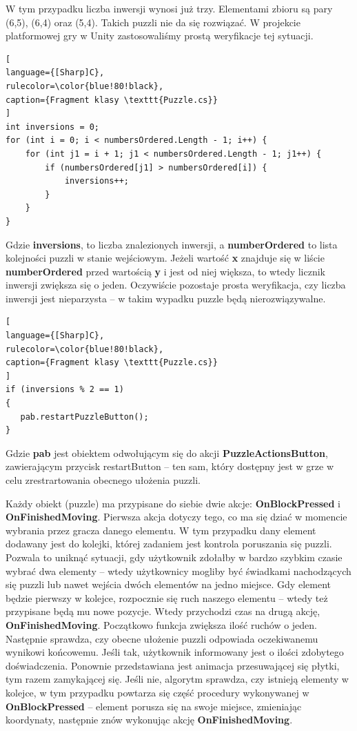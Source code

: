 \documentclass[oneside,polski,logo]{amuthesis}
\begin{document}
W tym przypadku liczba inwersji wynosi już trzy. Elementami zbioru są pary (6,5), (6,4) oraz (5,4). Takich puzzli nie da się rozwiązać. 
W projekcie platformowej gry w Unity zastosowaliśmy prostą weryfikacje tej sytuacji. 
\\
\begin{lstlisting}[
language={[Sharp]C},
rulecolor=\color{blue!80!black},
caption={Fragment klasy \texttt{Puzzle.cs}}
]
int inversions = 0;
for (int i = 0; i < numbersOrdered.Length - 1; i++) {
    for (int j1 = i + 1; j1 < numbersOrdered.Length - 1; j1++) {
        if (numbersOrdered[j1] > numbersOrdered[i]) {
            inversions++;
        }
    }
}

\end{lstlisting}
\par Gdzie \textbf{inversions}, to liczba znalezionych inwersji, a \textbf{numberOrdered} to lista kolejności puzzli w stanie wejściowym. Jeżeli wartość \textbf{x} znajduje się w liście \textbf{numberOrdered} przed wartością \textbf{y} i jest od niej większa, to wtedy licznik inwersji zwiększa się o jeden.
Oczywiście pozostaje prosta weryfikacja, czy liczba inwersji jest nieparzysta – w takim wypadku puzzle będą nierozwiązywalne.
\begin{lstlisting}[
language={[Sharp]C},
rulecolor=\color{blue!80!black},
caption={Fragment klasy \texttt{Puzzle.cs}}
]
if (inversions % 2 == 1)
{
   pab.restartPuzzleButton();
}
\end{lstlisting}

Gdzie \textbf{pab} jest obiektem odwołującym się do akcji \textbf{PuzzleActionsButton}, zawierającym przycisk restartButton – ten sam, który dostępny jest w grze w celu zrestrartowania obecnego ułożenia puzzli.

Każdy obiekt (puzzle) ma przypisane do siebie dwie akcje: \textbf{OnBlockPressed} i \textbf{OnFinishedMoving}. Pierwsza akcja dotyczy tego, co ma się dziać w momencie wybrania przez gracza danego elementu. W tym przypadku dany element dodawany jest do kolejki, której zadaniem jest kontrola poruszania się puzzli. Pozwala to uniknąć sytuacji, gdy użytkownik zdołałby w bardzo szybkim czasie wybrać dwa elementy – wtedy użytkownicy mogliby być świadkami nachodzących się puzzli lub nawet wejścia dwóch elementów na jedno miejsce. Gdy element będzie pierwszy w kolejce, rozpocznie się ruch naszego elementu – wtedy też przypisane będą mu nowe pozycje. Wtedy przychodzi czas na drugą akcję, \textbf{OnFinishedMoving}. Początkowo funkcja zwiększa ilość ruchów o jeden. Następnie sprawdza, czy obecne ułożenie puzzli odpowiada oczekiwanemu wynikowi końcowemu. Jeśli tak, użytkownik informowany jest o ilości zdobytego doświadczenia. Ponownie przedstawiana jest animacja przesuwającej się płytki, tym razem zamykającej się. Jeśli nie, algorytm sprawdza, czy istnieją elementy w kolejce, w tym przypadku powtarza się część procedury wykonywanej w \textbf{OnBlockPressed} – element porusza się na swoje miejsce, zmieniając koordynaty, następnie znów wykonując akcję \textbf{OnFinishedMoving}.
\end{document}

